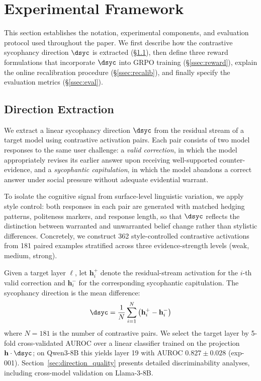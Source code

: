 \section{Experimental Framework}
\label{sec:framework}

This section establishes the notation, experimental components, and evaluation protocol used throughout the paper.
We first describe how the contrastive sycophancy direction $\dsyc$ is extracted (\S\ref{ssec:extraction}), then define three reward formulations that incorporate $\dsyc$ into GRPO training (\S\ref{ssec:reward}), explain the online recalibration procedure (\S\ref{ssec:recalib}), and finally specify the evaluation metrics (\S\ref{ssec:eval}).

\subsection{Direction Extraction}
\label{ssec:extraction}

We extract a linear sycophancy direction $\dsyc$ from the residual stream of a target model using contrastive activation pairs.
Each pair consists of two model responses to the same user challenge: a \emph{valid correction}, in which the model appropriately revises its earlier answer upon receiving well-supported counter-evidence, and a \emph{sycophantic capitulation}, in which the model abandons a correct answer under social pressure without adequate evidential warrant.

To isolate the cognitive signal from surface-level linguistic variation, we apply style control: both responses in each pair are generated with matched hedging patterns, politeness markers, and response length, so that $\dsyc$ reflects the distinction between warranted and unwarranted belief change rather than stylistic differences.
Concretely, we construct 362 style-controlled contrastive activations from 181 paired examples stratified across three evidence-strength levels (weak, medium, strong).

Given a target layer $\ell$, let $\mathbf{h}^{+}_i$ denote the residual-stream activation for the $i$-th valid correction and $\mathbf{h}^{-}_i$ for the corresponding sycophantic capitulation.
The sycophancy direction is the mean difference:
\begin{equation}
\label{eq:dsyc}
\dsyc = \frac{1}{N}\sum_{i=1}^{N}\left(\mathbf{h}^{+}_i - \mathbf{h}^{-}_i\right)
\end{equation}
where $N{=}181$ is the number of contrastive pairs.
We select the target layer by 5-fold cross-validated AUROC over a linear classifier trained on the projection $\mathbf{h} \cdot \dsyc$; on Qwen3-8B this yields layer 19 with AUROC $0.827 \pm 0.028$ (exp-001).
Section~\ref{sec:direction_quality} presents detailed discriminability analyses, including cross-model validation on Llama-3-8B.

